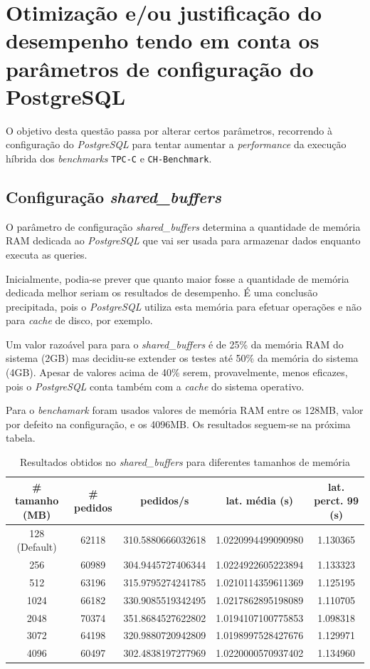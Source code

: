 \section{Otimização e/ou justificação do desempenho tendo em conta os parâmetros de configuração do PostgreSQL}

O objetivo desta questão passa por alterar certos parâmetros, recorrendo à configuração do \textit{PostgreSQL} para tentar aumentar a \textit{performance} da execução híbrida dos \textit{benchmarks} \verb+TPC-C+ e \verb+CH-Benchmark+.

\subsection{Configuração \textit{shared\_buffers}}

O parâmetro de configuração \textit{shared\_buffers} determina a quantidade de memória RAM dedicada ao \textit{PostgreSQL} que vai ser usada para armazenar dados enquanto executa as queries.

Inicialmente, podia-se prever que quanto maior fosse a quantidade de memória dedicada melhor seriam os resultados de desempenho. É uma conclusão precipitada, pois o \textit{PostgreSQL} utiliza esta memória para efetuar operações e não para \textit{cache} de disco, por exemplo.

Um valor razoável para para o \textit{shared\_buffers} é de 25\% da memória RAM do sistema (2GB) mas decidiu-se extender os testes até 50\% da memória do sistema (4GB). Apesar de valores acima de 40\% serem, provavelmente, menos eficazes, pois o \textit{PostgreSQL} conta também com a \textit{cache} do sistema operativo.

Para o \textit{benchamark} foram usados valores de memória RAM entre os 128MB, valor por defeito na configuração, e os 4096MB. Os resultados seguem-se na próxima tabela.

\begin{table}[!h]
\center
\small
\begin{tabular}{|c|c|c|c|c|}
\hline
\textbf{\# tamanho (MB)} & \textbf{\# pedidos} & \textbf{pedidos/s} & \textbf{lat. média (s)} & \textbf{lat. perct. 99 (s)}  \\ \hline
128 (Default) & 62118 & 310.5880666032618 & 1.0220994499090980 & 1.130365  \\ \hline
256 & 60989 & 304.9445727406344 & 1.0224922605223894 & 1.133323  \\ \hline
512 & 63196 & 315.9795274241785 & 1.0210114359611369 & 1.125195  \\ \hline
1024 & 66182 & 330.9085519342495 & 1.0217862895198089 & 1.110705  \\ \hline
2048 & 70374 & 351.8684527622802 & 1.0194107100775853 & 1.098318  \\ \hline
3072 & 64198 & 320.9880720942809 & 1.0198997528427676 & 1.129971  \\ \hline
4096 & 60497 & 302.4838197277969 & 1.0220000570937402 & 1.134960  \\ \hline
\end{tabular}
\caption{Resultados obtidos no \textit{shared\_buffers} para diferentes tamanhos de memória}
\end{table}

